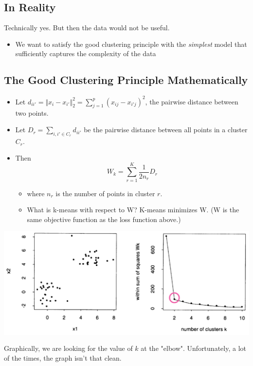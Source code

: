 \documentclass[10pt]{article}
\begin{document}
\subsection*{In Reality}
Technically yes.  But then the data would not be useful.
\begin{itemize}
    \item We want to satisfy the good clustering principle with the \textit{simplest} model that sufficiently captures the complexity of the data
\end{itemize}

\subsection*{The Good Clustering Principle Mathematically}
\begin{itemize}
    \item Let $d_{ii'} = \Vert x_i - x_{i'} \Vert_2^2 = \sum_{j = 1}^p (x_{ij} - x_{i'j})^2$, the pairwise distance between two points.
    \item Let $D_r = \sum_{i, i' \in C_r} d_{ii'}$ be the pairwise distance between all points in a cluster $C_r$.
    \item Then
    \[W_k = \sum_{r = 1}^K \frac{1}{2n_r} D_r\]
    \begin{itemize}
        \item where $n_r$ is the number of points in cluster $r$.
        \item What is k-means with respect to W?  K-means minimizes W.  (W is the same objective function as the loss function above.)
    \end{itemize}
\end{itemize}
\begin{center}
    \includegraphics*[scale=0.5]{W8_5.png}
\end{center}
Graphically, we are looking for the value of $k$ at the "elbow".  Unfortunately, a lot of the times, the graph isn't that clean.
\end{document}
